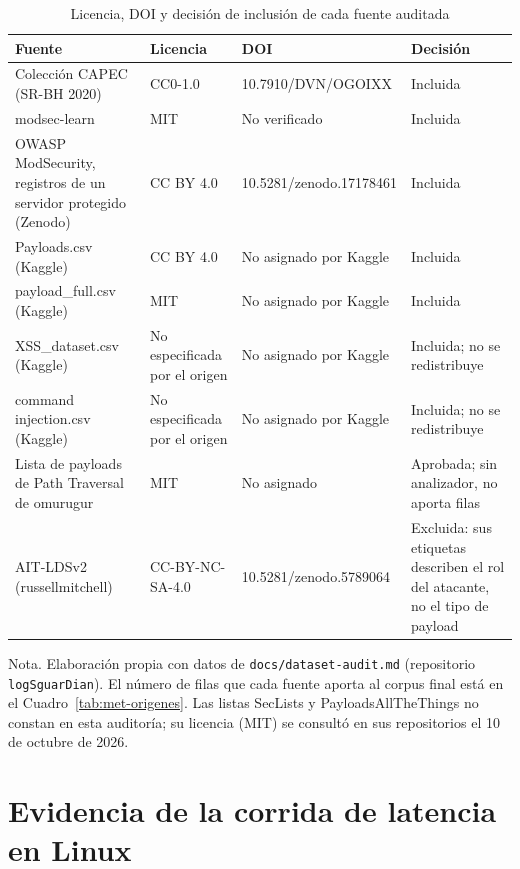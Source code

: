 \begin{table}[H]
\centering
\small
\begin{tabular}{|L{3.8cm}|L{3.0cm}|L{3.3cm}|L{3.6cm}|}
\hline
\textbf{Fuente} & \textbf{Licencia} & \textbf{DOI} & \textbf{Decisión} \\ \hline
Colección CAPEC (SR-BH 2020) \cite{sureda2022srbh,sureda2022newmultilabel} & CC0-1.0 & 10.7910/DVN/OGOIXX & Incluida \\ \hline
modsec-learn \cite{pralab2024modseclearn,scano2024modseclearn} & MIT & No verificado & Incluida \\ \hline
OWASP ModSecurity, registros de un servidor protegido (Zenodo) \cite{lucz2025} & CC BY 4.0 & 10.5281/zenodo.17178461 & Incluida \\ \hline
Payloads.csv (Kaggle) \cite{shahane2021xss} & CC BY 4.0 & No asignado por Kaggle & Incluida \\ \hline
payload\_full.csv (Kaggle) \cite{thakur2025payloads} & MIT & No asignado por Kaggle & Incluida \\ \hline
XSS\_dataset.csv (Kaggle) \cite{shah2020xss} & No especificada por el origen & No asignado por Kaggle & Incluida; no se redistribuye \\ \hline
command injection.csv (Kaggle) \cite{pawase2024cmdi} & No especificada por el origen & No asignado por Kaggle & Incluida; no se redistribuye \\ \hline
Lista de payloads de Path Traversal de omurugur \cite{ugur2019traversal} & MIT & No asignado & Aprobada; sin analizador, no aporta filas \\ \hline
AIT-LDSv2 (russellmitchell) \cite{landauer2022ait,landauer2023maintainable} & CC-BY-NC-SA-4.0 & 10.5281/zenodo.5789064 & Excluida: sus etiquetas describen el rol del atacante, no el tipo de payload \\ \hline
\end{tabular}
\caption[Auditoría de las fuentes de datos]{Licencia, DOI y decisión de inclusión de cada fuente auditada}
\label{tab:anx-auditoria}
\end{table}
{\footnotesize Nota. Elaboración propia con datos de \texttt{docs/dataset-audit.md} (repositorio
\texttt{logSguarDian}). El número de filas que cada fuente aporta al corpus final está en el
Cuadro~\ref{tab:met-origenes}. Las listas SecLists y PayloadsAllTheThings no constan en esta
auditoría; su licencia (MIT) se consultó en sus repositorios el 10 de octubre de 2026.}

\section{Evidencia de la corrida de latencia en Linux}
\label{anx:latencia}

